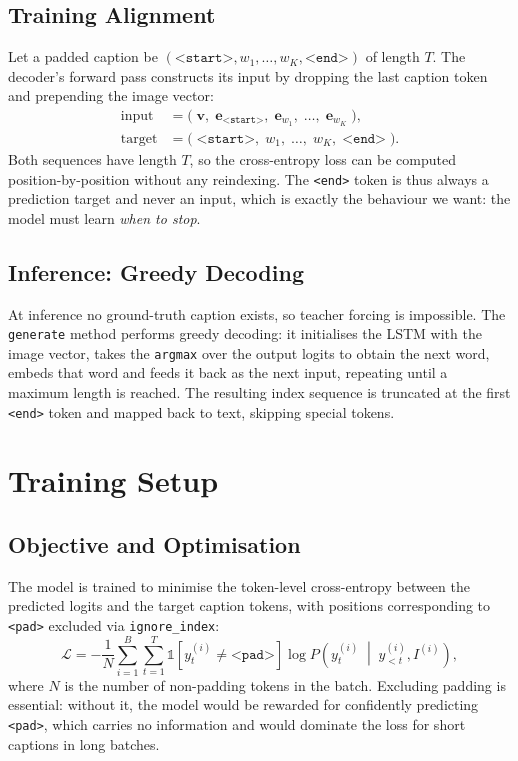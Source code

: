 \documentclass{article}
\begin{document}
\subsection{Training Alignment}

Let a padded caption be $(\texttt{<start>}, w_1, \dots, w_K, \texttt{<end>})$ of
length $T$. The decoder's forward pass constructs its input by dropping the last
caption token and prepending the image vector:
\begin{align*}
  \text{input}  &= \big(\; \mathbf{v},\;
                    \mathbf{e}_{\texttt{<start>}},\;
                    \mathbf{e}_{w_1},\; \dots,\; \mathbf{e}_{w_K} \;\big), \\
  \text{target} &= \big(\; \texttt{<start>},\; w_1,\; \dots,\; w_K,\;
                    \texttt{<end>} \;\big).
\end{align*}
Both sequences have length $T$, so the cross-entropy loss can be computed
position-by-position without any reindexing. The \texttt{<end>} token is thus
always a prediction target and never an input, which is exactly the behaviour we
want: the model must learn \emph{when to stop}.

\subsection{Inference: Greedy Decoding}

At inference no ground-truth caption exists, so teacher forcing is impossible.
The \texttt{generate} method performs greedy decoding: it initialises the LSTM
with the image vector, takes the \texttt{argmax} over the output logits to obtain
the next word, embeds that word and feeds it back as the next input, repeating
until a maximum length is reached. The resulting index sequence is truncated at
the first \texttt{<end>} token and mapped back to text, skipping special tokens.

\section{Training Setup}

\subsection{Objective and Optimisation}

The model is trained to minimise the token-level cross-entropy between the
predicted logits and the target caption tokens, with positions corresponding to
\texttt{<pad>} excluded via \texttt{ignore\_index}:
\begin{equation}
  \mathcal{L} = - \frac{1}{N} \sum_{i=1}^{B} \sum_{t=1}^{T}
  \mathbb{1}\!\left[ y^{(i)}_t \neq \texttt{<pad>} \right]
  \log P\!\left( y^{(i)}_t \;\middle|\; y^{(i)}_{<t}, I^{(i)} \right),
\end{equation}
where $N$ is the number of non-padding tokens in the batch. Excluding padding is
essential: without it, the model would be rewarded for confidently predicting
\texttt{<pad>}, which carries no information and would dominate the loss for
short captions in long batches.
\end{document}
